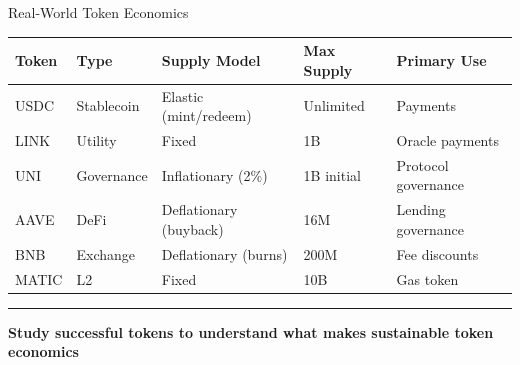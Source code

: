 \documentclass[8pt,aspectratio=169]{beamer}
\newcommand{\bottomnote}[1]{\vfill\vspace{-2mm}\textcolor{mllavender2}{\rule{\textwidth}{0.4pt}}\vspace{1mm}\footnotesize\textbf{#1}}
\begin{document}
\begin{frame}{Real-World Token Economics}
  \begin{center}
  {\small
  \begin{tabular}{@{}llllp{2.5cm}@{}}
    \toprule
    \textbf{Token} & \textbf{Type} & \textbf{Supply Model} & \textbf{Max Supply} & \textbf{Primary Use} \\
    \midrule
    USDC  & Stablecoin  & Elastic (mint/redeem)     & Unlimited & Payments \\
    LINK  & Utility     & Fixed                     & 1B        & Oracle payments \\
    UNI   & Governance  & Inflationary (2\%)        & 1B initial& Protocol governance \\
    AAVE  & DeFi        & Deflationary (buyback)    & 16M       & Lending governance \\
    BNB   & Exchange    & Deflationary (burns)      & 200M      & Fee discounts \\
    MATIC & L2          & Fixed                     & 10B       & Gas token \\
    \bottomrule
  \end{tabular}
  }
  \end{center}
  \bottomnote{Study successful tokens to understand what makes sustainable token economics}
\end{frame}
\end{document}
